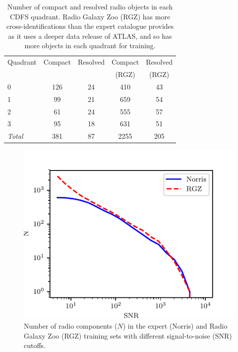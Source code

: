 \documentclass[fleqn,usenatbib,usedcolumn]{mnras}
\begin{document}
    \begin{table}
      \caption{Number of compact and resolved radio objects in each CDFS
      quadrant. Radio Galaxy Zoo (RGZ) has more cross-identifications than the
      expert catalogue provides as it uses a deeper data release of ATLAS, and
      so has more objects in each quadrant for training.}
      \label{tab:radio-count}
      \begin{tabular}{lcccc}
        \hline
        Quadrant & Compact & Resolved & Compact & Resolved\\
        &&&(RGZ)&(RGZ)\\
        \hline
        0 & 126 & 24 & 410 & 43 \\
        1 & 99 & 21 & 659 & 54 \\
        2 & 61 & 24 & 555 & 57 \\
        3 & 95 & 18 & 631 & 51 \\
        \hline
        \textit{Total} & 381 & 87 & 2255 & 205\\
        \hline
      \end{tabular}
    \end{table}

    \begin{figure}
      \centering
      \includegraphics[width=\columnwidth]{images/snr_cutoff_cumulative.pdf}
      \caption{Number of radio components ($N$) in the expert (Norris) and Radio Galaxy
        Zoo (RGZ) training sets with different signal-to-noise (SNR) cutoffs.}
      \label{fig:distribution-cutoffs}
    \end{figure}
\end{document}
